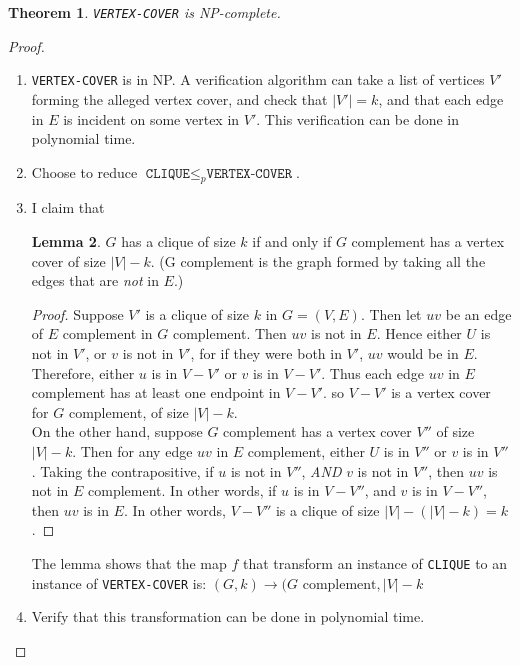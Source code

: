\documentclass[12pt]{article}
\theoremstyle{plain}
\newtheorem{theorem}{Theorem}[subsection]
\theoremstyle{definition}
\newtheorem{lemma}[theorem]{Lemma}
\begin{document}
\begin{theorem}
\texttt{VERTEX-COVER} is NP-complete.
\end{theorem}
\begin{proof}
\begin{enumerate}
  \item[1.] \texttt{VERTEX-COVER} is in NP.
  A verification algorithm can take a list of vertices $V'$ forming the alleged vertex cover, and check that $|V'| = k$, and that each edge in $E$ is incident on some vertex in $V'$.
  This verification can be done in polynomial time.

  \item[2.] Choose to reduce $\texttt{CLIQUE} \leq_{p} \texttt{VERTEX-COVER}$.

  \item[3.] I claim that
  \begin{lemma}
  $G$ has a clique of size $k$ if and only if $G$ complement has a vertex cover of size $|V| - k$. (G complement is the graph formed by taking all the edges that are \emph{not} in $E$.)
  \end{lemma}
  \begin{proof}
  Suppose $V'$ is a clique of size $k$ in $G = (V, E)$.
  Then let $uv$ be an edge of $E$ complement in $G$ complement.
  Then $uv$ is not in $E$.
  Hence either $U$ is not in $V'$, or $v$ is not in $V'$, for if they were both in $V'$, $uv$ would be in $E$.
  Therefore, either $u$ is in $V - V'$ or $v$ is in $V - V'$.
  Thus each edge $uv$ in $E$ complement has at least one endpoint in $V - V'$. so $V - V'$ is a vertex cover for $G$ complement, of size $|V| - k$. \\

  On the other hand, suppose $G$ complement has a vertex cover $V''$ of size $|V| - k$.
  Then for any edge $uv$ in $E$ complement, either $U$ is in $V''$ or $v$ is in $V''$.
  Taking the contrapositive, if $u$ is not in $V''$, \emph{AND} $v$ is not in $V''$, then $uv$ is not in $E$ complement.
  In other words, if $u$ is in $V - V''$, and $v$ is in $V - V''$, then $uv$ is in $E$.
  In other words, $V - V''$ is a clique of size $|V| - (|V| - k) = k$.
  \end{proof}

  The lemma shows that the map $f$ that transform an instance of \texttt{CLIQUE} to an instance of \texttt{VERTEX-COVER} is: $(G, k) \rightarrow (G \text{ complement}, |V| - k$

  \item[4.] Verify that this transformation can be done in polynomial time.
\end{enumerate}
\end{proof}
\end{document}
